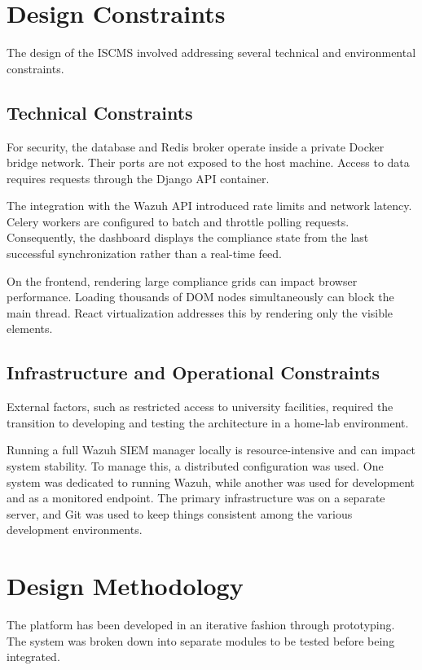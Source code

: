 \section{Design Constraints}
The design of the ISCMS involved addressing several technical and environmental constraints.

\subsection{Technical Constraints}
For security, the database and Redis broker operate inside a private Docker bridge network. Their ports are not exposed to the host machine. Access to data requires requests through the Django API container.

The integration with the Wazuh API introduced rate limits and network latency. Celery workers are configured to batch and throttle polling requests. Consequently, the dashboard displays the compliance state from the last successful synchronization rather than a real-time feed.

On the frontend, rendering large compliance grids can impact browser performance. Loading thousands of DOM nodes simultaneously can block the main thread. React virtualization addresses this by rendering only the visible elements.

\subsection{Infrastructure and Operational Constraints}
External factors, such as restricted access to university facilities, required the transition to developing and testing the architecture in a home-lab environment.

Running a full Wazuh SIEM manager locally is resource-intensive and can impact system stability. To manage this, a distributed configuration was used. One system was dedicated to running Wazuh, while another was used for development and as a monitored endpoint. The primary infrastructure was on a separate server, and Git was used to keep things consistent among the various development environments.

\section{Design Methodology}
The platform has been developed in an iterative fashion through prototyping. The system was broken down into separate modules to be tested before being integrated.

